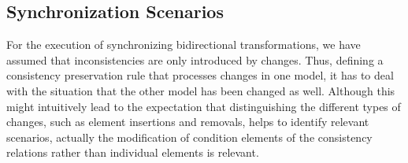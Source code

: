 



\subsection{Synchronization Scenarios}

For the execution of synchronizing bidirectional transformations, we have assumed that inconsistencies are only introduced by changes.
Thus, defining a consistency preservation rule that processes changes in one model, it has to deal with the situation that the other model has been changed as well.
Although this might intuitively lead to the expectation that distinguishing the different types of changes, such as element insertions and removals, helps to identify relevant scenarios, actually the modification of condition elements of the consistency relations rather than individual elements is relevant.

